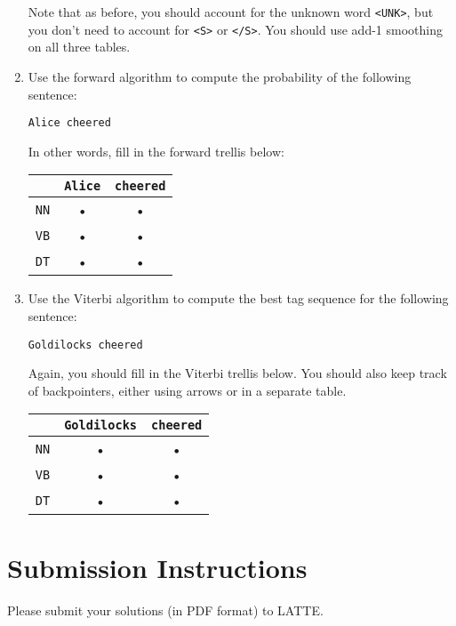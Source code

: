 \documentclass[11pt,letterpaper]{article}
\begin{document}
\begin{enumerate}
Note that as before, you should account for the unknown word \texttt{<UNK>}, but you don't need to account for \texttt{<S>} or \texttt{</S>}. You should use add-1 smoothing on all three tables.\newpage

\item Use the forward algorithm to compute the probability of the following sentence:

\texttt{Alice cheered}

In other words, fill in the forward trellis below:
\begin{center}
\begin{tabular}{|c|c|c|}
\hline 
 & \texttt{Alice} & \texttt{cheered} \\ 
\hline 
\texttt{NN} & • & • \\ 
\hline 
\texttt{VB} & • & • \\ 
\hline 
\texttt{DT} & • & • \\ 
\hline 
\end{tabular} 
\end{center}

\item Use the Viterbi algorithm to compute the best tag sequence for the following sentence:

\texttt{Goldilocks cheered}

Again, you should fill in the Viterbi trellis below. You should also keep track of backpointers, either using arrows or in a separate table.
\begin{center}
\begin{tabular}{|c|c|c|}
\hline 
& \texttt{Goldilocks} & \texttt{cheered} \\ 
\hline 
\texttt{NN} & • & • \\ 
\hline 
\texttt{VB} & • & • \\ 
\hline 
\texttt{DT} & • & • \\ 
\hline 
\end{tabular} 
\end{center}

\end{enumerate}

\section*{Submission Instructions}

Please submit your solutions (in PDF format) to LATTE.
\end{document}
